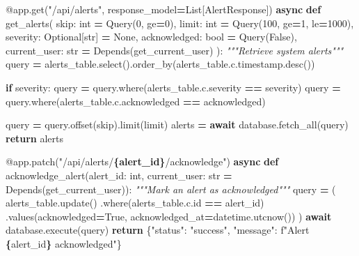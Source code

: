 \documentclass[
]{article}
\newenvironment{Shaded}{\begin{snugshade}}{\end{snugshade}}
\newcommand{\AttributeTok}[1]{\textcolor[rgb]{0.13,0.29,0.53}{#1}}
\newcommand{\BuiltInTok}[1]{#1}
\newcommand{\CommentTok}[1]{\textcolor[rgb]{0.56,0.35,0.01}{\textit{#1}}}
\newcommand{\ControlFlowTok}[1]{\textcolor[rgb]{0.13,0.29,0.53}{\textbf{#1}}}
\newcommand{\DecValTok}[1]{\textcolor[rgb]{0.00,0.00,0.81}{#1}}
\newcommand{\KeywordTok}[1]{\textcolor[rgb]{0.13,0.29,0.53}{\textbf{#1}}}
\newcommand{\NormalTok}[1]{#1}
\newcommand{\OperatorTok}[1]{\textcolor[rgb]{0.81,0.36,0.00}{\textbf{#1}}}
\newcommand{\SpecialCharTok}[1]{\textcolor[rgb]{0.81,0.36,0.00}{\textbf{#1}}}
\newcommand{\SpecialStringTok}[1]{\textcolor[rgb]{0.31,0.60,0.02}{#1}}
\newcommand{\StringTok}[1]{\textcolor[rgb]{0.31,0.60,0.02}{#1}}
\newcommand{\VariableTok}[1]{\textcolor[rgb]{0.00,0.00,0.00}{#1}}
\begin{document}
\begin{Shaded}
\begin{Highlighting}[]
\AttributeTok{@app.get}\NormalTok{(}\StringTok{"/api/alerts"}\NormalTok{, response\_model}\OperatorTok{=}\NormalTok{List[AlertResponse])}
\ControlFlowTok{async} \KeywordTok{def}\NormalTok{ get\_alerts(}
\NormalTok{    skip: }\BuiltInTok{int} \OperatorTok{=}\NormalTok{ Query(}\DecValTok{0}\NormalTok{, ge}\OperatorTok{=}\DecValTok{0}\NormalTok{),}
\NormalTok{    limit: }\BuiltInTok{int} \OperatorTok{=}\NormalTok{ Query(}\DecValTok{100}\NormalTok{, ge}\OperatorTok{=}\DecValTok{1}\NormalTok{, le}\OperatorTok{=}\DecValTok{1000}\NormalTok{),}
\NormalTok{    severity: Optional[}\BuiltInTok{str}\NormalTok{] }\OperatorTok{=} \VariableTok{None}\NormalTok{,}
\NormalTok{    acknowledged: }\BuiltInTok{bool} \OperatorTok{=}\NormalTok{ Query(}\VariableTok{False}\NormalTok{),}
\NormalTok{    current\_user: }\BuiltInTok{str} \OperatorTok{=}\NormalTok{ Depends(get\_current\_user)}
\NormalTok{):}
    \CommentTok{"""Retrieve system alerts"""}
\NormalTok{    query }\OperatorTok{=}\NormalTok{ alerts\_table.select().order\_by(alerts\_table.c.timestamp.desc())}

    \ControlFlowTok{if}\NormalTok{ severity:}
\NormalTok{        query }\OperatorTok{=}\NormalTok{ query.where(alerts\_table.c.severity }\OperatorTok{==}\NormalTok{ severity)}
\NormalTok{    query }\OperatorTok{=}\NormalTok{ query.where(alerts\_table.c.acknowledged }\OperatorTok{==}\NormalTok{ acknowledged)}

\NormalTok{    query }\OperatorTok{=}\NormalTok{ query.offset(skip).limit(limit)}
\NormalTok{    alerts }\OperatorTok{=} \ControlFlowTok{await}\NormalTok{ database.fetch\_all(query)}
    \ControlFlowTok{return}\NormalTok{ alerts}

\AttributeTok{@app.patch}\NormalTok{(}\StringTok{"/api/alerts/}\SpecialCharTok{\{alert\_id\}}\StringTok{/acknowledge"}\NormalTok{)}
\ControlFlowTok{async} \KeywordTok{def}\NormalTok{ acknowledge\_alert(alert\_id: }\BuiltInTok{int}\NormalTok{, current\_user: }\BuiltInTok{str} \OperatorTok{=}\NormalTok{ Depends(get\_current\_user)):}
    \CommentTok{"""Mark an alert as acknowledged"""}
\NormalTok{    query }\OperatorTok{=}\NormalTok{ (}
\NormalTok{        alerts\_table.update()}
\NormalTok{        .where(alerts\_table.c.}\BuiltInTok{id} \OperatorTok{==}\NormalTok{ alert\_id)}
\NormalTok{        .values(acknowledged}\OperatorTok{=}\VariableTok{True}\NormalTok{, acknowledged\_at}\OperatorTok{=}\NormalTok{datetime.utcnow())}
\NormalTok{    )}
    \ControlFlowTok{await}\NormalTok{ database.execute(query)}
    \ControlFlowTok{return}\NormalTok{ \{}\StringTok{"status"}\NormalTok{: }\StringTok{"success"}\NormalTok{, }\StringTok{"message"}\NormalTok{: }\SpecialStringTok{f"Alert }\SpecialCharTok{\{}\NormalTok{alert\_id}\SpecialCharTok{\}}\SpecialStringTok{ acknowledged"}\NormalTok{\}}


\end{Highlighting}
\end{Shaded}
\end{document}

